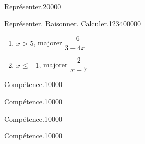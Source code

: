 \begin{pageParcourst}
\begin{ExoCtN}{Représenter.}{2}{0}{0}{0}{0}
\end{ExoCtN}

\begin{ExoCt}{Représenter. Raisonner. Calculer.}{1234}{0}{0}{0}{0}{0}

\begin{enumerate}
\item $x > 5 $, majorer $\dfrac{-6}{3-4x}$ 
\item $x \leq -1$, majorer $\dfrac{2}{x-7}$
\end{enumerate}

\end{ExoCt}
 
\end{pageParcourst} %


\begin{pageAuto} %

\begin{ExoAutoN}{Compétence.}{1}{0}{0}{0}{0}

\end{ExoAutoN}

\begin{ExoAutoN}{Compétence.}{1}{0}{0}{0}{0}

\end{ExoAutoN}


\begin{ExoAutoN}{Compétence.}{1}{0}{0}{0}{0}

\end{ExoAutoN}


\begin{ExoAutoN}{Compétence.}{1}{0}{0}{0}{0}

\end{ExoAutoN}

\end{pageAuto} %


\begin{pageBrouillon}

\end{pageBrouillon}


